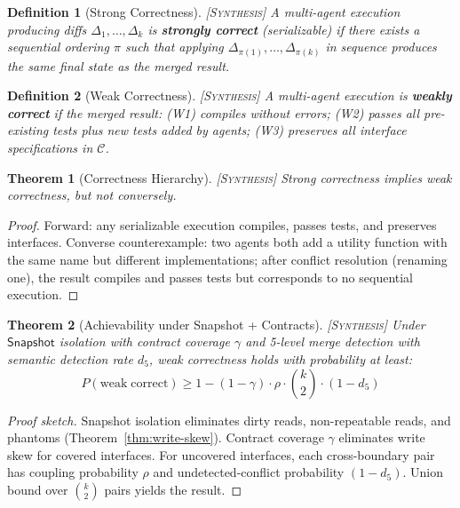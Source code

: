 \documentclass[11pt, a4paper, copyright]{googledeepmind}
\newtheorem{definition}{Definition}[section]
\newtheorem{theorem}{Theorem}[section]
\newcommand{\synthesis}{\textsc{[Synthesis]}}
\begin{document}
\begin{definition}[Strong Correctness] \synthesis{}
A multi-agent execution producing diffs $\Delta_1, \ldots, \Delta_k$ is \textbf{strongly correct} (serializable) if there exists a sequential ordering $\pi$ such that applying $\Delta_{\pi(1)}, \ldots, \Delta_{\pi(k)}$ in sequence produces the same final state as the merged result.
\end{definition}

\begin{definition}[Weak Correctness] \synthesis{}
A multi-agent execution is \textbf{weakly correct} if the merged result: (W1) compiles without errors; (W2) passes all pre-existing tests plus new tests added by agents; (W3) preserves all interface specifications in $\mathcal{C}$.
\end{definition}

\begin{theorem}[Correctness Hierarchy] \synthesis{}
\label{thm:correctness}
Strong correctness implies weak correctness, but not conversely.
\end{theorem}

\begin{proof}
Forward: any serializable execution compiles, passes tests, and preserves interfaces.
Converse counterexample: two agents both add a utility function with the same name but different implementations; after conflict resolution (renaming one), the result compiles and passes tests but corresponds to no sequential execution.
\end{proof}

\begin{theorem}[Achievability under Snapshot + Contracts] \synthesis{}
\label{thm:achievability}
Under $\mathsf{Snapshot}$ isolation with contract coverage $\gamma$ and 5-level merge detection with semantic detection rate $d_5$, weak correctness holds with probability at least:
\begin{equation}
  P(\mathrm{weak\;correct}) \geq 1 - (1-\gamma) \cdot \rho \cdot \binom{k}{2} \cdot (1 - d_5)
\end{equation}
\end{theorem}

\begin{proof}[Proof sketch]
Snapshot isolation eliminates dirty reads, non-repeatable reads, and phantoms (Theorem~\ref{thm:write-skew}).
Contract coverage $\gamma$ eliminates write skew for covered interfaces.
For uncovered interfaces, each cross-boundary pair has coupling probability $\rho$ and undetected-conflict probability $(1 - d_5)$.
Union bound over $\binom{k}{2}$ pairs yields the result.
\end{proof}
\end{document}

